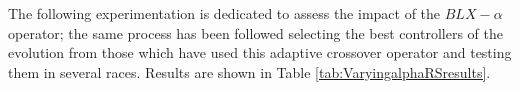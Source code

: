 \documentclass[10pt,journal,compsoc]{IEEEtran}
\begin{document}
The following experimentation is dedicated to assess the impact of the
$BLX-\alpha$ operator; the same process has been followed
selecting the best controllers of the evolution from those which
have used this adaptive crossover operator and testing them in several
races. Results are shown in Table \ref{tab:VaryingalphaRSresults}. 
%
%
%
%
%				
%				
\end{document}
